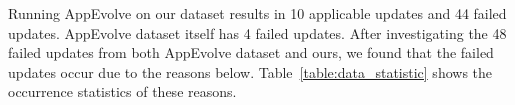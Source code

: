 Running AppEvolve on our dataset results in 10 applicable updates and 44 failed updates. AppEvolve dataset itself has 4 failed updates. After investigating the 48 failed updates from both AppEvolve dataset and ours, we found that the failed updates occur due to the reasons below. Table~\ref{table:data_statistic} shows the occurrence statistics of these reasons. 


